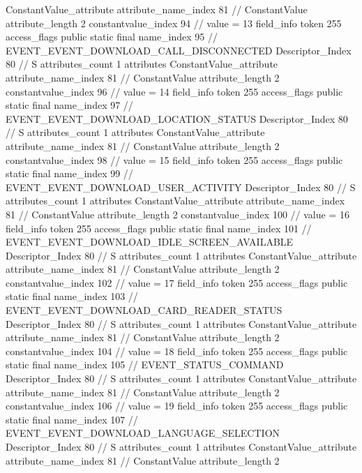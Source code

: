 {{{{{{				ConstantValue_attribute {
					attribute_name_index	81		// ConstantValue
					attribute_length	2
					constantvalue_index	94		// value = 13
				}
				}
			}
			field_info {
				token	255
				access_flags	public static final
				name_index	95		// EVENT_EVENT_DOWNLOAD_CALL_DISCONNECTED
				Descriptor_Index	80		// S
				attributes_count	1
				attributes {
				ConstantValue_attribute {
					attribute_name_index	81		// ConstantValue
					attribute_length	2
					constantvalue_index	96		// value = 14
				}
				}
			}
			field_info {
				token	255
				access_flags	public static final
				name_index	97		// EVENT_EVENT_DOWNLOAD_LOCATION_STATUS
				Descriptor_Index	80		// S
				attributes_count	1
				attributes {
				ConstantValue_attribute {
					attribute_name_index	81		// ConstantValue
					attribute_length	2
					constantvalue_index	98		// value = 15
				}
				}
			}
			field_info {
				token	255
				access_flags	public static final
				name_index	99		// EVENT_EVENT_DOWNLOAD_USER_ACTIVITY
				Descriptor_Index	80		// S
				attributes_count	1
				attributes {
				ConstantValue_attribute {
					attribute_name_index	81		// ConstantValue
					attribute_length	2
					constantvalue_index	100		// value = 16
				}
				}
			}
			field_info {
				token	255
				access_flags	public static final
				name_index	101		// EVENT_EVENT_DOWNLOAD_IDLE_SCREEN_AVAILABLE
				Descriptor_Index	80		// S
				attributes_count	1
				attributes {
				ConstantValue_attribute {
					attribute_name_index	81		// ConstantValue
					attribute_length	2
					constantvalue_index	102		// value = 17
				}
				}
			}
			field_info {
				token	255
				access_flags	public static final
				name_index	103		// EVENT_EVENT_DOWNLOAD_CARD_READER_STATUS
				Descriptor_Index	80		// S
				attributes_count	1
				attributes {
				ConstantValue_attribute {
					attribute_name_index	81		// ConstantValue
					attribute_length	2
					constantvalue_index	104		// value = 18
				}
				}
			}
			field_info {
				token	255
				access_flags	public static final
				name_index	105		// EVENT_STATUS_COMMAND
				Descriptor_Index	80		// S
				attributes_count	1
				attributes {
				ConstantValue_attribute {
					attribute_name_index	81		// ConstantValue
					attribute_length	2
					constantvalue_index	106		// value = 19
				}
				}
			}
			field_info {
				token	255
				access_flags	public static final
				name_index	107		// EVENT_EVENT_DOWNLOAD_LANGUAGE_SELECTION
				Descriptor_Index	80		// S
				attributes_count	1
				attributes {
				ConstantValue_attribute {
					attribute_name_index	81		// ConstantValue
					attribute_length	2
}}}}}}}
